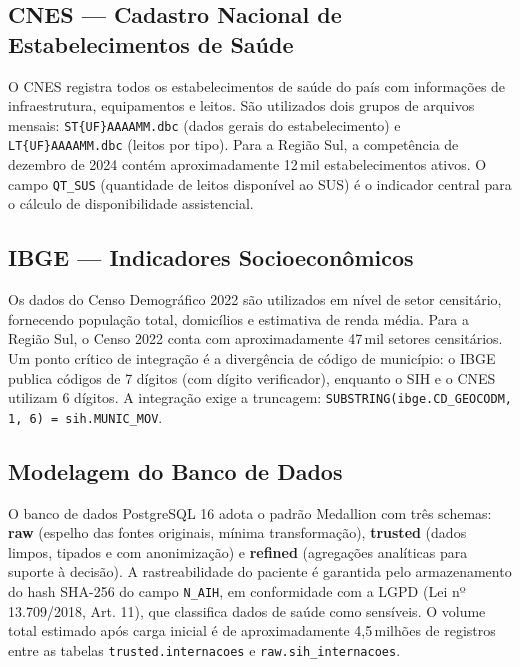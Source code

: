 \documentclass[12pt]{article}
\begin{document}
\subsection{CNES — Cadastro Nacional de Estabelecimentos de Saúde}

O CNES registra todos os estabelecimentos de saúde do país com informações
de infraestrutura, equipamentos e leitos. São utilizados dois grupos de
arquivos mensais: \texttt{ST\{UF\}AAAAMM.dbc} (dados gerais do estabelecimento)
e \texttt{LT\{UF\}AAAAMM.dbc} (leitos por tipo). Para a Região Sul, a
competência de dezembro de 2024 contém aproximadamente 12\,mil estabelecimentos
ativos. O campo \texttt{QT\_SUS} (quantidade de leitos disponível ao SUS) é
o indicador central para o cálculo de disponibilidade assistencial.

\subsection{IBGE — Indicadores Socioeconômicos}

Os dados do Censo Demográfico 2022 são utilizados em nível de setor censitário,
fornecendo população total, domicílios e estimativa de renda média. Para a
Região Sul, o Censo 2022 conta com aproximadamente 47\,mil setores censitários.
Um ponto crítico de integração é a divergência de código de município: o IBGE
publica códigos de 7 dígitos (com dígito verificador), enquanto o SIH e o CNES
utilizam 6 dígitos. A integração exige a truncagem:
\texttt{SUBSTRING(ibge.CD\_GEOCODM, 1, 6) = sih.MUNIC\_MOV}.

\subsection{Modelagem do Banco de Dados}

O banco de dados PostgreSQL 16 adota o padrão Medallion com três schemas:
\textbf{raw} (espelho das fontes originais, mínima transformação),
\textbf{trusted} (dados limpos, tipados e com anonimização) e
\textbf{refined} (agregações analíticas para suporte à decisão). A
rastreabilidade do paciente é garantida pelo armazenamento do hash
SHA-256 do campo \texttt{N\_AIH}, em conformidade com a LGPD
(Lei nº 13.709/2018, Art. 11), que classifica dados de saúde como sensíveis.
O volume total estimado após carga inicial é de aproximadamente 4,5\,milhões
de registros entre as tabelas \texttt{trusted.internacoes} e
\texttt{raw.sih\_internacoes}.


\end{document}
